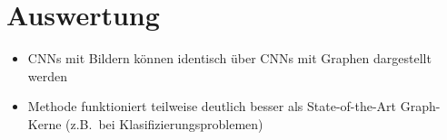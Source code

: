 \section{Auswertung}

\begin{itemize}
  \item CNNs mit Bildern können identisch über CNNs mit Graphen dargestellt werden
  \item Methode funktioniert teilweise deutlich besser als State-of-the-Art Graph-Kerne (z.B.\ bei Klasifizierungsproblemen)
\end{itemize}
